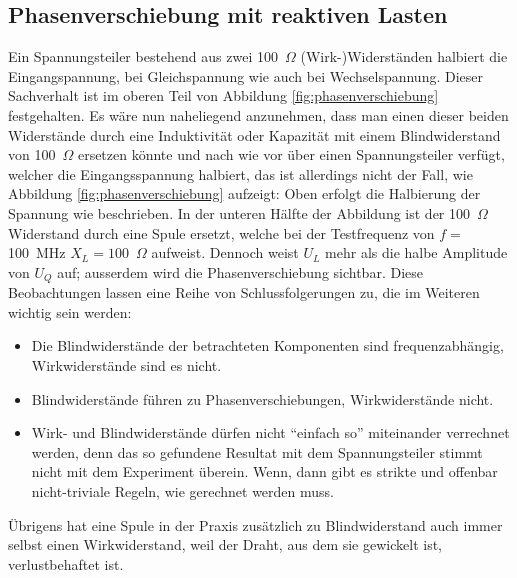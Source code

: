 \documentclass[twoside,a4paper,11pt,halfparskip,DIV=11,notitlepage]{scrartcl}
\begin{document}
\subsection{Phasenverschiebung mit reaktiven Lasten}
Ein Spannungsteiler bestehend aus zwei 100~$\Omega$ (Wirk-)Widerständen
halbiert die Eingangspannung, bei Gleichspannung wie auch bei Wechselspannung.
Dieser Sachverhalt ist im oberen Teil von Abbildung \ref{fig:phasenverschiebung} festgehalten.
Es wäre nun naheliegend anzunehmen, dass man einen dieser beiden Widerstände
durch eine Induktivität oder Kapazität mit einem Blindwiderstand von 100~$\Omega$
ersetzen könnte und nach wie vor über einen Spannungsteiler verfügt, welcher
die Eingangsspannung halbiert, das ist allerdings nicht der Fall, wie Abbildung
\ref{fig:phasenverschiebung} aufzeigt: Oben erfolgt die Halbierung der Spannung
wie beschrieben. In der unteren Hälfte der Abbildung ist der 100~$\Omega$
Widerstand durch eine Spule ersetzt, welche bei der Testfrequenz von $f=$100~MHz
$X_L=100$~$\Omega$ aufweist. Dennoch weist $U_L$ mehr als die halbe Amplitude von
$U_Q$ auf; ausserdem wird die Phasenverschiebung sichtbar. Diese Beobachtungen
lassen eine Reihe von Schlussfolgerungen zu, die im Weiteren wichtig sein werden:

\begin{itemize}
    \item Die Blindwiderstände der betrachteten Komponenten sind frequenzabhängig,
        Wirkwiderstände sind es nicht.
    \item Blindwiderstände führen zu Phasenverschiebungen, Wirkwiderstände nicht.
    \item Wirk- und Blindwiderstände dürfen nicht ``einfach so'' miteinander
        verrechnet werden, denn das so gefundene Resultat mit dem Spannungsteiler 
        stimmt nicht mit dem Experiment überein. Wenn, dann gibt es strikte und
        offenbar nicht-triviale Regeln, wie gerechnet werden muss.
\end{itemize}

Übrigens hat eine Spule in der Praxis zusätzlich zu Blindwiderstand auch immer
selbst einen Wirkwiderstand, weil der Draht, aus dem sie gewickelt ist,
verlustbehaftet ist. 
\end{document}
